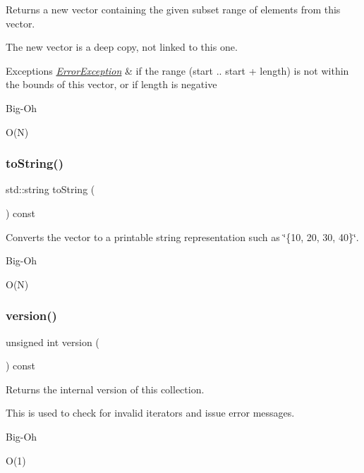 Returns a new vector containing the given subset range of elements from this vector. 

The new vector is a deep copy, not linked to this one. 
\begin{DoxyExceptions}{Exceptions}
{\em \mbox{\hyperlink{classErrorException}{Error\+Exception}}} & if the range (start .. start + length) is not within the bounds of this vector, or if length is negative \\
\hline
\end{DoxyExceptions}
\begin{DoxyRefDesc}{Big-\/\+Oh}
\item[\mbox{\hyperlink{BigOh__BigOh000135}{Big-\/\+Oh}}]O(\+N) \end{DoxyRefDesc}
\mbox{\label{classVector_a1fe5121d6528fdea3f243321b3fa3a49}} 
\subsubsection{\texorpdfstring{to\+String()}{toString()}}
{\footnotesize\ttfamily std\+::string to\+String (\begin{DoxyParamCaption}{ }\end{DoxyParamCaption}) const}



Converts the vector to a printable string representation such as \char`\"{}\{10, 20, 30, 40\}\char`\"{}. 

\begin{DoxyRefDesc}{Big-\/\+Oh}
\item[\mbox{\hyperlink{BigOh__BigOh000136}{Big-\/\+Oh}}]O(\+N) \end{DoxyRefDesc}
\mbox{\label{classVector_a0aa696ccb72cbf928535d6b646bac1aa}} 
\subsubsection{\texorpdfstring{version()}{version()}}
{\footnotesize\ttfamily unsigned int version (\begin{DoxyParamCaption}{ }\end{DoxyParamCaption}) const}



Returns the internal version of this collection. 

This is used to check for invalid iterators and issue error messages. \begin{DoxyRefDesc}{Big-\/\+Oh}
\item[\mbox{\hyperlink{BigOh__BigOh000155}{Big-\/\+Oh}}]O(1) \end{DoxyRefDesc}
